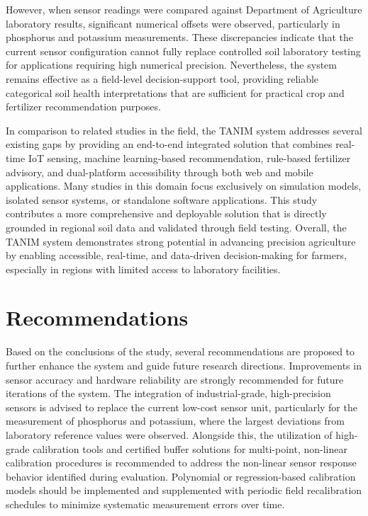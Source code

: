 {However, when sensor readings were compared against Department of Agriculture laboratory results, significant numerical offsets were observed, particularly in phosphorus and potassium measurements. These discrepancies indicate that the current sensor configuration cannot fully replace controlled soil laboratory testing for applications requiring high numerical precision. Nevertheless, the system remains effective as a field-level decision-support tool, providing reliable categorical soil health interpretations that are sufficient for practical crop and fertilizer recommendation purposes.

In comparison to related studies in the field, the TANIM system addresses several existing gaps by providing an end-to-end integrated solution that combines real-time IoT sensing, machine learning-based recommendation, rule-based fertilizer advisory, and dual-platform accessibility through both web and mobile applications. Many studies in this domain focus exclusively on simulation models, isolated sensor systems, or standalone software applications. This study contributes a more comprehensive and deployable solution that is directly grounded in regional soil data and validated through field testing. Overall, the TANIM system demonstrates strong potential in advancing precision agriculture by enabling accessible, real-time, and data-driven decision-making for farmers, especially in regions with limited access to laboratory facilities.
\section{Recommendations}

Based on the conclusions of the study, several recommendations are proposed to further enhance the system and guide future research directions. Improvements in sensor accuracy and hardware reliability are strongly recommended for future iterations of the system. The integration of industrial-grade, high-precision sensors is advised to replace the current low-cost sensor unit, particularly for the measurement of phosphorus and potassium, where the largest deviations from laboratory reference values were observed. Alongside this, the utilization of high-grade calibration tools and certified buffer solutions for multi-point, non-linear calibration procedures is recommended to address the non-linear sensor response behavior identified during evaluation. Polynomial or regression-based calibration models should be implemented and supplemented with periodic field recalibration schedules to minimize systematic measurement errors over time.

}
